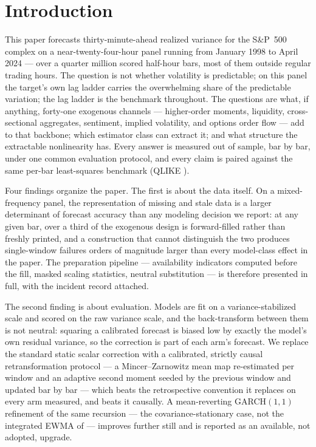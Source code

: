 \section{Introduction}
\label{sec:intro}

This paper forecasts thirty-minute-ahead realized variance for the
S\&P~500 complex on a near-twenty-four-hour panel running from January
1998 to April 2024 --- over a quarter million scored half-hour bars,
most of them outside regular trading hours. The question is not whether
volatility is predictable; on this panel the target's own lag ladder
carries the overwhelming share of the predictable variation; the lag
ladder is the benchmark throughout. The questions are what, if anything,
forty-one exogenous channels --- higher-order moments, liquidity,
cross-sectional aggregates, sentiment, implied volatility, and options
order flow --- add to that backbone; which estimator class can extract
it; and what structure the extractable nonlinearity has. Every answer is
measured out of sample, bar by bar, under one common evaluation
protocol, and every claim is paired against the same per-bar
least-squares benchmark (QLIKE \unifAzeroQLIKE{}).

Four findings organize the paper. The first is about the data itself.
On a mixed-frequency panel, the representation of missing and stale data
is a larger determinant of forecast accuracy than any modeling decision
we report: at any given bar, over a third of the exogenous design is
forward-filled rather than freshly printed, and a construction that
cannot distinguish the two produces single-window failures orders of
magnitude larger than every model-class effect in the paper. The
preparation pipeline --- availability indicators computed before the
fill, masked scaling statistics, neutral substitution --- is therefore
presented in full, with the incident record attached.

The second finding is about evaluation. Models are fit on a
variance-stabilized scale and scored on the raw variance scale, and the
back-transform between them is not neutral: squaring a calibrated
forecast is biased low by exactly the model's own residual variance, so
the correction is part of each arm's forecast. We replace the standard
static scalar correction with a calibrated, strictly causal retransformation protocol --- a
Mincer--Zarnowitz mean map re-estimated per window and an adaptive
second moment seeded by the previous window and updated bar by bar ---
which beats the retrospective \citet{Duan1983} convention it replaces on
every arm measured, and beats it causally. A mean-reverting
GARCH$(1,1)$ refinement \citep{Bollerslev1986,EngleMezrich1996} of
the same recursion --- the covariance-stationary case, not the
integrated EWMA of \citet{EngleBollerslev1986} --- improves further
still and is reported as an available, not adopted, upgrade.

